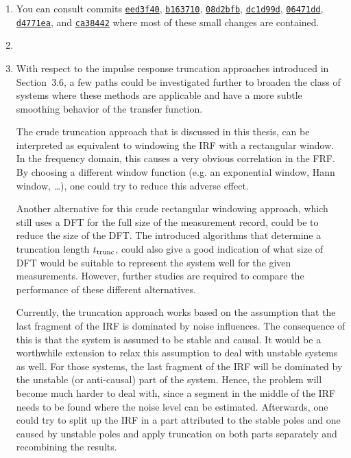 \documentclass{responseletter}
\newcommand{\commit}[1]{\href{https://github.com/egeerardyn/phdthesis/commit/#1}{\texttt{#1}}}
\begin{document}
\begin{enumerate}

\item {}
You can consult commits
  \commit{eed3f40}, 
  \commit{b163710}, 
  \commit{08d2bfb},  
  \commit{dc1d99d}, 
  \commit{06471dd}, 
  \commit{d4771ea}, and
  \commit{ca38442} where most of these small changes are contained.

\item {}

\item {}
\begin{newquote}
    With respect to the impulse response truncation approaches introduced in Section~3.6, a few paths could be investigated further to broaden the class of systems where these methods are applicable and have a more subtle smoothing behavior of the transfer function.

    The crude truncation approach that is discussed in this thesis, can be interpreted as equivalent to windowing the \gls{IRF} with a rectangular window.
    In the frequency domain, this causes a very obvious correlation in the \gls{FRF}.
    By choosing a different window function (e.g. an exponential window, Hann window, \ldots), one could try to reduce this adverse effect.

   Another alternative for this crude rectangular windowing approach, which still uses a \gls{DFT} for the full size of the measurement record, could be to reduce the size of the \gls{DFT}.
   The introduced algorithms that determine a truncation length $t_{\mathrm{trunc}}$, could also give a good indication of what size of \gls{DFT} would be suitable to represent the system well for the given measurements.
   However, further studies are required to compare the performance of these different alternatives.

   Currently, the truncation approach works based on the assumption that the last fragment of the \gls{IRF} is dominated by noise influences.
   The consequence of this is that the system is assumed to be stable and causal.
   It would be a worthwhile extension to relax this assumption to deal with unstable systems as well.
   For those systems, the last fragment of the \gls{IRF} will be dominated by the unstable (or anti-causal) part of the system. 
   Hence, the problem will become much harder to deal with, since a segment in the middle of the \gls{IRF} needs to be found where the noise level can be estimated.
   Afterwards, one could try to split up the \gls{IRF} in a part attributed to the stable poles and one caused by unstable poles and apply truncation on both parts separately and recombining the results.
\end{newquote}


\end{enumerate}
\end{document}
